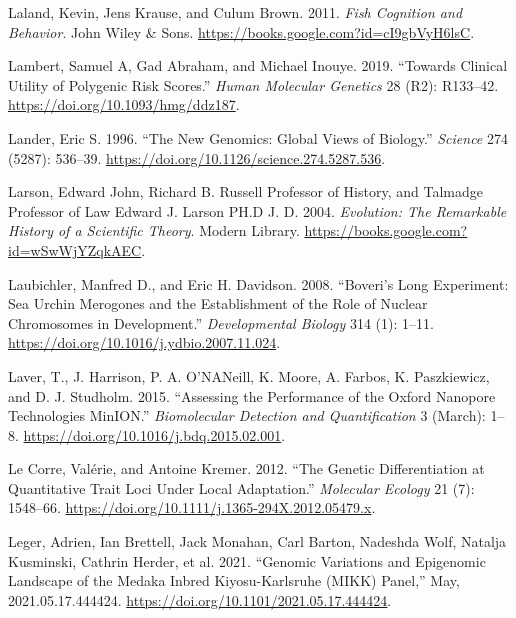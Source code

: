 \documentclass[
]{book}
\newlength{\cslhangindent}
\newlength{\cslentryspacingunit} %
\newenvironment{CSLReferences}[2] %
 {%
  \setlength{\parindent}{0pt}
  \ifodd #1
  \let\oldpar\par
  \def\par{\hangindent=\cslhangindent\oldpar}
  \fi
  \setlength{\parskip}{#2\cslentryspacingunit}
 }%
 {}
\begin{document}
\begin{CSLReferences}{1}{0}
\leavevmode{}%
Laland, Kevin, Jens Krause, and Culum Brown. 2011. \emph{Fish {Cognition} and {Behavior}}. {John Wiley \& Sons}. \url{https://books.google.com?id=cI9gbVyH6lsC}.

\leavevmode{}%
Lambert, Samuel A, Gad Abraham, and Michael Inouye. 2019. {``Towards Clinical Utility of Polygenic Risk Scores.''} \emph{Human Molecular Genetics} 28 (R2): R133--42. \url{https://doi.org/10.1093/hmg/ddz187}.

\leavevmode{}%
Lander, Eric S. 1996. {``The {New Genomics}: {Global Views} of {Biology}.''} \emph{Science} 274 (5287): 536--39. \url{https://doi.org/10.1126/science.274.5287.536}.

\leavevmode{}%
Larson, Edward John, Richard B. Russell Professor of History, and Talmadge Professor of Law Edward J. Larson PH.D J. D. 2004. \emph{Evolution: {The Remarkable History} of a {Scientific Theory}}. {Modern Library}. \url{https://books.google.com?id=wSwWjYZqkAEC}.

\leavevmode{}%
Laubichler, Manfred D., and Eric H. Davidson. 2008. {``Boveri's Long Experiment: {Sea} Urchin Merogones and the Establishment of the Role of Nuclear Chromosomes in Development.''} \emph{Developmental Biology} 314 (1): 1--11. \url{https://doi.org/10.1016/j.ydbio.2007.11.024}.

\leavevmode{}%
Laver, T., J. Harrison, P. A. O'NANeill, K. Moore, A. Farbos, K. Paszkiewicz, and D. J. Studholm. 2015. {``Assessing the Performance of the {Oxford Nanopore Technologies MinION}.''} \emph{Biomolecular Detection and Quantification} 3 (March): 1--8. \url{https://doi.org/10.1016/j.bdq.2015.02.001}.

\leavevmode{}%
Le Corre, Valérie, and Antoine Kremer. 2012. {``The Genetic Differentiation at Quantitative Trait Loci Under Local Adaptation.''} \emph{Molecular Ecology} 21 (7): 1548--66. \url{https://doi.org/10.1111/j.1365-294X.2012.05479.x}.

\leavevmode{}%
Leger, Adrien, Ian Brettell, Jack Monahan, Carl Barton, Nadeshda Wolf, Natalja Kusminski, Cathrin Herder, et al. 2021. {``Genomic Variations and Epigenomic Landscape of the {Medaka Inbred Kiyosu-Karlsruhe} ({MIKK}) Panel,''} May, 2021.05.17.444424. \url{https://doi.org/10.1101/2021.05.17.444424}.


\end{CSLReferences}
\end{document}
